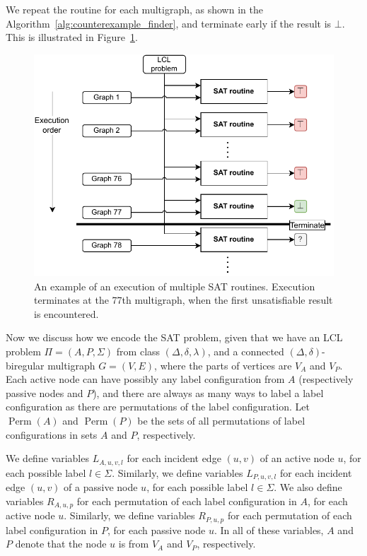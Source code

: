We repeat the routine for each multigraph, as shown in the Algorithm~\ref{alg:counterexample_finder}, and terminate early if the result is $\bot$.
This is illustrated in Figure~\ref{fig:implementation:2}.

\begin{figure}[H]
\centering
\includegraphics[]{diagrams/implementation_idea_diagram3a.pdf}
\caption{An example of an execution of multiple SAT routines. Execution terminates at the 77th multigraph, when the first unsatisfiable result is encountered.}
\label{fig:implementation:2}
\end{figure}

Now we discuss how we encode the SAT problem, given that we have an LCL problem $\Pi=(A, P, \Sigma)$ from class $(\Delta, \delta, \lambda)$, and a connected $(\Delta, \delta)$-biregular multigraph $G=(V,E)$, where the parts of vertices are $V_A$ and $V_P$.
Each active node can have possibly any label configuration from $A$ (respectively passive nodes and $P$), and there are always as many ways to label a label configuration as there are permutations of the label configuration.
Let $\operatorname{Perm}(A)$ and $\operatorname{Perm}(P)$ be the sets of all permutations of label configurations in sets $A$ and $P$, respectively.

We define variables $L_{A,u,v,l}$ for each incident edge $(u, v)$ of an active node $u$, for each possible label $l \in \Sigma$.
Similarly, we define variables $L_{P,u,v,l}$ for each incident edge $(u, v)$ of a passive node $u$, for each possible label $l \in \Sigma$.
We also define variables $R_{A, u, p}$ for each permutation of each label configuration in $A$, for each active node $u$.
Similarly, we define variables $R_{P, u, p}$ for each permutation of each label configuration in $P$, for each passive node $u$.
In all of these variables, $A$ and $P$ denote that the node $u$ is from $V_A$ and $V_P$, respectively.


